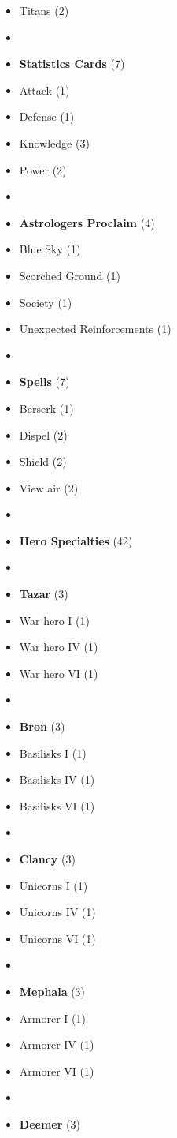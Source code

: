 \begin{multicols}{3}
\begin{itemize}[leftmargin=0pt, label={}, noitemsep]
  \item Titans (2)
  \item
  \item \textbf{Statistics Cards} (7)
  \item Attack (1)
  \item Defense (1)
  \item Knowledge (3)
  \item Power (2)
  \item
  \item \textbf{Astrologers Proclaim} (4)
  \item Blue Sky (1)
  \item Scorched Ground (1)
  \item Society (1)
  \item Unexpected Reinforcements (1)
  \item
  \item \textbf{Spells} (7)
  \item Berserk (1)
  \item Dispel (2)
  \item Shield (2)
  \item View air (2)
  \item
  \item \textbf{Hero Specialties} (42)
  \item
  \item \textbf{Tazar} (3)
  \item War hero I (1)
  \item War hero IV (1)
  \item War hero VI (1)
  \item
  \item \textbf{Bron} (3)
  \item Basilisks I (1)
  \item Basilisks IV (1)
  \item Basilisks VI (1)
  \item
  \item \textbf{Clancy} (3)
  \item Unicorns I (1)
  \item Unicorns IV (1)
  \item Unicorns VI (1)
  \item
  \item \textbf{Mephala} (3)
  \item Armorer I (1)
  \item Armorer IV (1)
  \item Armorer VI (1)
  \item
  \item \textbf{Deemer} (3)

\end{itemize}
\end{multicols}
